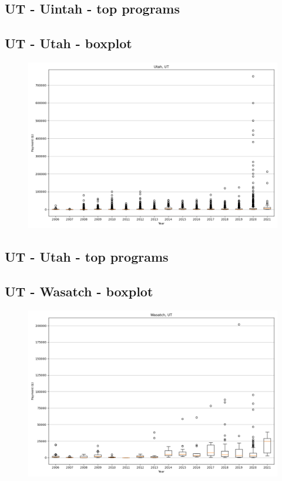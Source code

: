 \subsection*{UT - Uintah - top programs}

\newpage
\subsection*{UT - Utah - boxplot}
\begin{figure}[h]
\centering
\includegraphics[width=7in]{../output/boxplots/counties/Utah-UT_boxplot.png}
\end{figure}


\subsection*{UT - Utah - top programs}

\newpage
\subsection*{UT - Wasatch - boxplot}
\begin{figure}[h]
\centering
\includegraphics[width=7in]{../output/boxplots/counties/Wasatch-UT_boxplot.png}
\end{figure}


